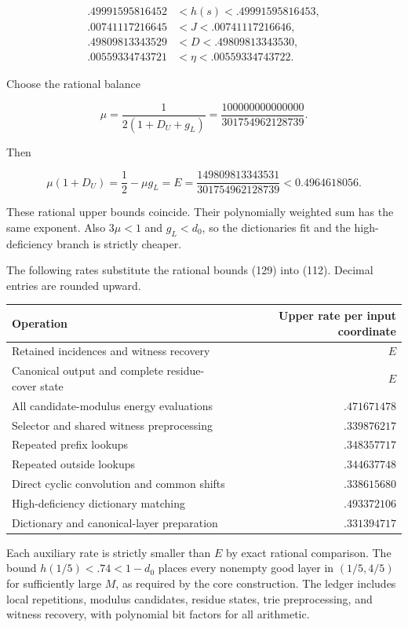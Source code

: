 \[
\begin{aligned}
.49991595816452&<h(s)<.49991595816453,\\
.00741117216645&<J<.00741117216646,\\
.49809813343529&<D<.49809813343530,\\
.00559334743721&<\eta<.00559334743722.
\end{aligned}
\tag{130}
\]

Choose the rational balance

\[
\mu=\frac1{2(1+D_U+g_L)}
=\frac{100000000000000}{301754962128739}.
\]

Then

\[
\mu(1+D_U)=\frac12-\mu g_L
=E=\frac{149809813343531}{301754962128739}
<0.4964618056.
\tag{131}
\]

These rational upper bounds coincide. Their polynomially weighted sum has the same exponent. Also \(3\mu<1\) and \(g_L<d_0\), so the dictionaries fit and the high-deficiency branch is strictly cheaper.

The following rates substitute the rational bounds (129) into (112). Decimal entries are rounded upward.

\begin{longtable}[]{@{}lr@{}}
\toprule\noalign{}
Operation & Upper rate per input coordinate \\
\midrule\noalign{}
\endhead
\bottomrule\noalign{}
\endlastfoot
Retained incidences and witness recovery & \(E\) \\
Canonical output and complete residue-cover state & \(E\) \\
All candidate-modulus energy evaluations & \(.471671478\) \\
Selector and shared witness preprocessing & \(.339876217\) \\
Repeated prefix lookups & \(.348357717\) \\
Repeated outside lookups & \(.344637748\) \\
Direct cyclic convolution and common shifts & \(.338615680\) \\
High-deficiency dictionary matching & \(.493372106\) \\
Dictionary and canonical-layer preparation & \(.331394717\) \\
\end{longtable}

Each auxiliary rate is strictly smaller than \(E\) by exact rational comparison. The bound \(h(1/5)<.74<1-d_0\) places every nonempty good layer in \((1/5,4/5)\) for sufficiently large \(M\), as required by the core construction. The ledger includes local repetitions, modulus candidates, residue states, trie preprocessing, and witness recovery, with polynomial bit factors for all arithmetic.

